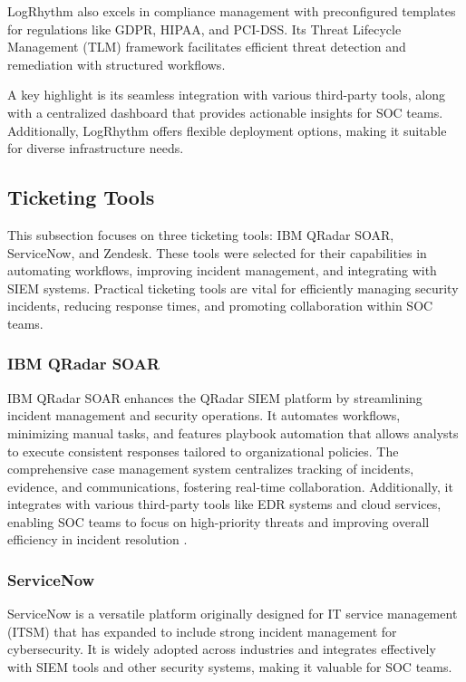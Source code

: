 LogRhythm also excels in compliance management with preconfigured templates for regulations like GDPR, HIPAA, and PCI-DSS. 
Its Threat Lifecycle Management (TLM) framework facilitates efficient threat detection and remediation with structured workflows. 

A key highlight is its seamless integration with various third-party tools, along with a centralized dashboard that provides actionable insights for SOC teams. 
Additionally, LogRhythm offers flexible deployment options, making it suitable for diverse infrastructure needs.

\subsection{Ticketing Tools}

This subsection focuses on three ticketing tools: IBM QRadar SOAR, ServiceNow, and Zendesk. 
These tools were selected for their capabilities in automating workflows, improving incident management, and integrating with \gls{SIEM} systems. 
Practical ticketing tools are vital for efficiently managing security incidents, reducing response times, and promoting collaboration within \gls{SOC} teams.

\subsubsection{IBM QRadar SOAR}
IBM QRadar SOAR enhances the QRadar SIEM platform by streamlining incident management and security operations. 
It automates workflows, minimizing manual tasks, and features playbook automation that allows analysts to execute consistent responses tailored to organizational policies. 
The comprehensive case management system centralizes tracking of incidents, evidence, and communications, fostering real-time collaboration. 
Additionally, it integrates with various third-party tools like EDR systems and cloud services, enabling SOC teams to focus on high-priority threats and improving overall efficiency in incident resolution \parencite{ibm}.

\subsubsection{ServiceNow}
ServiceNow is a versatile platform originally designed for IT service management (ITSM) that has expanded to include strong incident management for cybersecurity. 
It is widely adopted across industries and integrates effectively with SIEM tools and other security systems, making it valuable for SOC teams.


